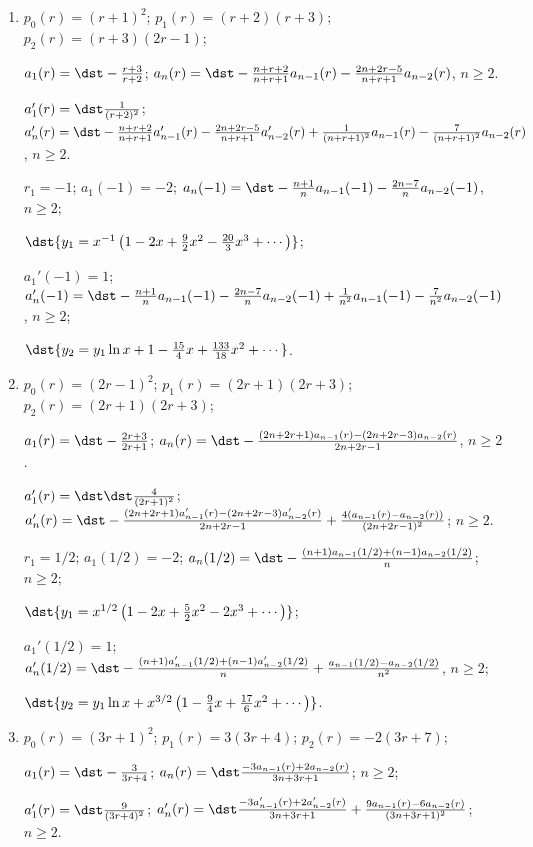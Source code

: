 \documentclass[openany]{book}
\newenvironment{sectionSolutions}{
 \begin{enumerate}[item-label={\thesection.\arabic{enumi}.}]
}{
 \end{enumerate}
}
\begin{document}
\begin{sectionSolutions}
\item
$p_0(r)=(r+1)^2$;
$p_1(r)=(r+2)(r+3)$;
$p_2(r)=(r+3)(2r-1)$;

$a_1(r)=\dst-\frac{r+3}{ r+2}$;
$a_n(r)=\dst-\frac{n+r+2}{ n+r+1}a_{n-1}(r)-\frac{2n+2r-5}{
n+r+1}a_{n-2}(r)$,
$n\ge2$.

$a_1'(r)=\dst\frac{1}{(r+2)^2}$;
$a_n'(r)=\dst-\frac{n+r+2}{ n+r+1}a_{n-1}'(r)-\frac{2n+2r-5}{
n+r+1}a_{n-2}'(r)+\frac{1}{(n+r+1)^2}a_{n-1}(r)-\frac{7}{(n+r+1)^2}a_{n-2}(r)$,
$n\ge2$.

$r_1=-1$;
$a_1(-1)=-2$;
$a_n(-1)=\dst-\frac{n+1}{ n}a_{n-1}(-1)-\frac{2n-7}{ n}a_{n-2}(-1)$,
$n\ge2$;

$\dst{y_1=x^{-1}\left(1-2x+\frac{9}{2}x^2-\frac{20}{3}x^3+\cdots\right)}$;

$a_1'(-1)=1$;
$a_n'(-1)=\dst-\frac{n+1}{ n}a_{n-1}(-1)-\frac{2n-7}{ n}a_{n-2}(-1)
+\frac{1}{ n^2}a_{n-1}(-1)-\frac{7}{ n^2}a_{n-2}(-1)$,
$n\ge2$;

$\dst{y_2=
y_1\ln x+1-\frac{15}{4}x+\frac{133}{18}x^2+\cdots}$.


\item
$p_0(r)=(2r-1)^2$;
$p_1(r)=(2r+1)(2r+3)$;
$p_2(r)=(2r+1)(2r+3)$;

$a_1(r)=\dst-\frac{2r+3}{2r+1}$;
$a_n(r)=\dst
-\frac{(2n+2r+1)a_{n-1}(r)-(2n+2r-3)a_{n-2}(r)}{2n+2r-1}$,
$n\ge2$.

$a_1'(r)=\dst\dst\frac{4}{(2r+1)^2}$;
$a_n'(r)=\dst
-\frac{(2n+2r+1)a_{n-1}'(r)-(2n+2r-3)a_{n-2}'(r)}{2n+2r-1}
+\frac{4(a_{n-1}(r)-a_{n-2}(r))}{(2n+2r-1)^2}$;
$n\ge2$.

$r_1=1/2$;
$a_1(1/2)=-2$;
$a_n(1/2)=\dst
-\frac{(n+1)a_{n-1}(1/2)+(n-1)a_{n-2}(1/2)}{ n}$;
$n\ge2$;

$\dst{y_1=x^{1/2}\left(1-2x+\frac{5}{2}x^2-2x^3+\cdots\right)}$;

$a_1'(1/2)=1$;
$a_n'(1/2)=\dst
-\frac{(n+1)a_{n-1}'(1/2)+(n-1)a_{n-2}'(1/2)}{ n}
+\frac{a_{n-1}(1/2)-a_{n-2}(1/2)}{ n^2}$,
$n\ge2$;

$\dst{y_2=
y_1\ln x+x^{3/2}\left(1-\frac{9}{4}x+\frac{17}{6}x^2+
\cdots\right)}$.


\item
$p_0(r)=(3r+1)^2$;
$p_1(r)=3(3r+4)$;
$p_2(r)=-2(3r+7)$;

$a_1(r)=\dst-\frac{3}{3r+4}$;
$a_n(r)=\dst
\frac{-3a_{n-1}(r)+2a_{n-2}(r)}{3n+3r+1}$;
$n\ge2$;

$a_1'(r)=\dst\frac{9}{(3r+4)^2}$;
$a_n'(r)=\dst
\frac{-3a_{n-1}'(r)+2a_{n-2}'(r)}{3n+3r+1}
+\frac{9a_{n-1}(r)-6a_{n-2}(r)}{(3n+3r+1)^2}$;
$n\ge2$.


\end{sectionSolutions}
\end{document}
